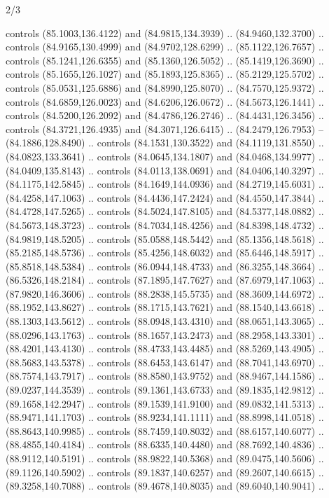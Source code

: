 \begin{flagdescription}{2/3}
\begin{scope}[shift={(0.5\flaglength,0.5)},scale=\flagwidth/320]
\begin{scope}[y=0.8pt, x=0.8pt, yscale=-1,shift={(-118.3,-146)}]
  controls (85.1003,136.4122) and (84.9815,134.3939) .. (84.9460,132.3700) ..
  controls (84.9165,130.4999) and (84.9702,128.6299) .. (85.1122,126.7657) ..
  controls (85.1241,126.6355) and (85.1360,126.5052) .. (85.1419,126.3690) ..
  controls (85.1655,126.1027) and (85.1893,125.8365) .. (85.2129,125.5702) ..
  controls (85.0531,125.6886) and (84.8990,125.8070) .. (84.7570,125.9372) ..
  controls (84.6859,126.0023) and (84.6206,126.0672) .. (84.5673,126.1441) ..
  controls (84.5200,126.2092) and (84.4786,126.2746) .. (84.4431,126.3456) ..
  controls (84.3721,126.4935) and (84.3071,126.6415) .. (84.2479,126.7953) --
  (84.1886,128.8490) .. controls (84.1531,130.3522) and (84.1119,131.8550) ..
  (84.0823,133.3641) .. controls (84.0645,134.1807) and (84.0468,134.9977) ..
  (84.0409,135.8143) .. controls (84.0113,138.0691) and (84.0406,140.3297) ..
  (84.1175,142.5845) .. controls (84.1649,144.0936) and (84.2719,145.6031) ..
  (84.4258,147.1063) .. controls (84.4436,147.2424) and (84.4550,147.3844) ..
  (84.4728,147.5265) .. controls (84.5024,147.8105) and (84.5377,148.0882) ..
  (84.5673,148.3723) .. controls (84.7034,148.4256) and (84.8398,148.4732) ..
  (84.9819,148.5205) .. controls (85.0588,148.5442) and (85.1356,148.5618) ..
  (85.2185,148.5736) .. controls (85.4256,148.6032) and (85.6446,148.5917) ..
  (85.8518,148.5384) .. controls (86.0944,148.4733) and (86.3255,148.3664) ..
  (86.5326,148.2184) .. controls (87.1895,147.7627) and (87.6979,147.1063) ..
  (87.9820,146.3606) .. controls (88.2838,145.5735) and (88.3609,144.6972) ..
  (88.1952,143.8627) .. controls (88.1715,143.7621) and (88.1540,143.6618) ..
  (88.1303,143.5612) .. controls (88.0948,143.4310) and (88.0651,143.3065) ..
  (88.0296,143.1763) .. controls (88.1657,143.2473) and (88.2958,143.3301) ..
  (88.4201,143.4130) .. controls (88.4733,143.4485) and (88.5269,143.4905) ..
  (88.5683,143.5378) .. controls (88.6453,143.6147) and (88.7041,143.6970) ..
  (88.7574,143.7917) .. controls (88.8580,143.9752) and (88.9467,144.1586) ..
  (89.0237,144.3539) .. controls (89.1361,143.6733) and (89.1835,142.9812) ..
  (89.1658,142.2947) .. controls (89.1539,141.9100) and (89.0832,141.5313) ..
  (88.9471,141.1703) .. controls (88.9234,141.1111) and (88.8998,141.0518) ..
  (88.8643,140.9985) .. controls (88.7459,140.8032) and (88.6157,140.6077) ..
  (88.4855,140.4184) .. controls (88.6335,140.4480) and (88.7692,140.4836) ..
  (88.9112,140.5191) .. controls (88.9822,140.5368) and (89.0475,140.5606) ..
  (89.1126,140.5902) .. controls (89.1837,140.6257) and (89.2607,140.6615) ..
  (89.3258,140.7088) .. controls (89.4678,140.8035) and (89.6040,140.9041) ..

\end{scope}
\end{scope}
\end{flagdescription}
